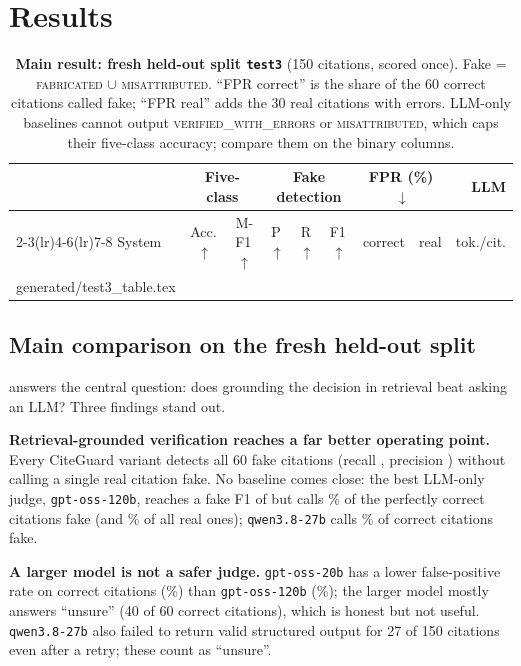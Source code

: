 \documentclass[10pt,twocolumn,a4paper]{article}
\makeatletter
\newcommand{\verdict}[1]{\textsc{\MakeLowercase{#1}}}
\newcommand{\cg}{CiteGuard}
\newcommand{\tabinput}[1]{\@@input #1 }  %
\makeatother
\begin{document}
\section{Results}
\label{sec:results}

\begin{table}[t]
\centering
\caption{\textbf{Main result: fresh held-out split \texttt{test3}} (150 citations, scored once).
Fake = \verdict{FABRICATED} $\cup$ \verdict{MISATTRIBUTED}. ``FPR correct'' is the share of the 60
correct citations called fake; ``FPR real'' adds the 30 real citations with errors. LLM-only
baselines cannot output \verdict{VERIFIED\_WITH\_ERRORS} or \verdict{MISATTRIBUTED}, which caps their
five-class accuracy; compare them on the binary columns.}
\label{tab:test3}
\small
\setlength{\tabcolsep}{5pt}
\begin{tabular}{@{}lcccccccr@{}}
\toprule
 & \multicolumn{2}{c}{Five-class} & \multicolumn{3}{c}{Fake detection} & \multicolumn{2}{c}{FPR (\%)\,$\downarrow$} & LLM \\
\cmidrule(lr){2-3}\cmidrule(lr){4-6}\cmidrule(lr){7-8}
System & Acc.\,$\uparrow$ & M-F1\,$\uparrow$ & P\,$\uparrow$ & R\,$\uparrow$ & F1\,$\uparrow$ & correct & real & tok./cit. \\
\midrule
\tabinput{generated/test3_table.tex}
\bottomrule
\end{tabular}
\end{table}

\subsection{Main comparison on the fresh held-out split}
 answers the central question: does grounding the decision in retrieval beat asking
an LLM? Three findings stand out.

\textbf{Retrieval-grounded verification reaches a far better operating point.} Every \cg{} variant
detects all 60 fake citations (recall \NoLlmRec, precision \NoLlmPrec) without calling a single real
citation fake. No baseline comes close: the best LLM-only judge, \texttt{gpt-oss-120b}, reaches a
fake F1 of \LlmBigF{} but calls \LlmBigCFPR\% of the perfectly correct citations fake (and
\LlmBigFPR\% of all real ones); \texttt{qwen3.8-27b} calls \LlmQwenCFPR\% of correct citations fake.

\textbf{A larger model is not a safer judge.} \texttt{gpt-oss-20b} has a lower false-positive rate on
correct citations (\LlmTwentyCFPR\%) than \texttt{gpt-oss-120b} (\LlmBigCFPR\%); the larger model
mostly answers ``unsure'' (40 of 60 correct citations), which is honest but not useful.
\texttt{qwen3.8-27b} also failed to return valid structured output for 27 of 150 citations even
after a retry; these count as ``unsure''.
\end{document}
